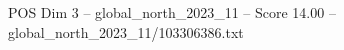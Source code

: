 \begin{textsample}{POS Dim 3 – global\_north\_2023\_11 – Score 14.00 – global\_north\_2023\_11/103306386.txt}
\end{textsample}
